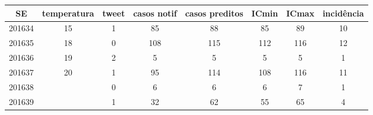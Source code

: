 \begin{tabular}{c|ccccccc}
  \hline
SE & temperatura & tweet & casos notif & casos preditos & ICmin & ICmax & incidência \\ 
  \hline
201634 & 15 & 1 & 85 & 88 & 85 & 89 & 10 \\ 
  201635 & 18 & 0 & 108 & 115 & 112 & 116 & 12 \\ 
  201636 & 19 & 2 & 5 & 5 & 5 & 5 & 1 \\ 
  201637 & 20 & 1 & 95 & 114 & 108 & 116 & 11 \\ 
  201638 &  & 0 & 6 & 6 & 6 & 7 & 1 \\ 
  201639 &  & 1 & 32 & 62 & 55 & 65 & 4 \\ 
   \hline
\end{tabular}
